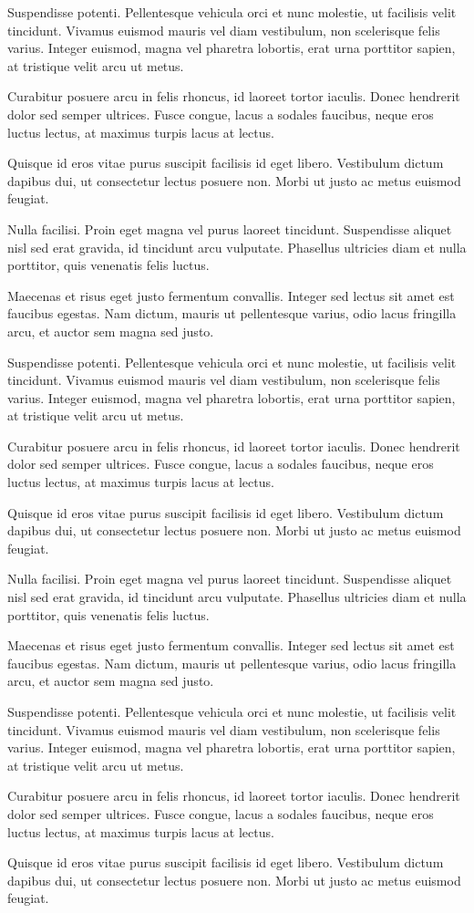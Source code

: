 Suspendisse potenti. Pellentesque vehicula orci et nunc molestie, ut facilisis velit tincidunt. Vivamus euismod mauris vel diam vestibulum, non scelerisque felis varius. Integer euismod, magna vel pharetra lobortis, erat urna porttitor sapien, at tristique velit arcu ut metus.

Curabitur posuere arcu in felis rhoncus, id laoreet tortor iaculis. Donec hendrerit dolor sed semper ultrices. Fusce congue, lacus a sodales faucibus, neque eros luctus lectus, at maximus turpis lacus at lectus.

Quisque id eros vitae purus suscipit facilisis id eget libero. Vestibulum dictum dapibus dui, ut consectetur lectus posuere non. Morbi ut justo ac metus euismod feugiat.

Nulla facilisi. Proin eget magna vel purus laoreet tincidunt. Suspendisse aliquet nisl sed erat gravida, id tincidunt arcu vulputate. Phasellus ultricies diam et nulla porttitor, quis venenatis felis luctus.

Maecenas et risus eget justo fermentum convallis. Integer sed lectus sit amet est faucibus egestas. Nam dictum, mauris ut pellentesque varius, odio lacus fringilla arcu, et auctor sem magna sed justo.

Suspendisse potenti. Pellentesque vehicula orci et nunc molestie, ut facilisis velit tincidunt. Vivamus euismod mauris vel diam vestibulum, non scelerisque felis varius. Integer euismod, magna vel pharetra lobortis, erat urna porttitor sapien, at tristique velit arcu ut metus.

Curabitur posuere arcu in felis rhoncus, id laoreet tortor iaculis. Donec hendrerit dolor sed semper ultrices. Fusce congue, lacus a sodales faucibus, neque eros luctus lectus, at maximus turpis lacus at lectus.

Quisque id eros vitae purus suscipit facilisis id eget libero. Vestibulum dictum dapibus dui, ut consectetur lectus posuere non. Morbi ut justo ac metus euismod feugiat.

Nulla facilisi. Proin eget magna vel purus laoreet tincidunt. Suspendisse aliquet nisl sed erat gravida, id tincidunt arcu vulputate. Phasellus ultricies diam et nulla porttitor, quis venenatis felis luctus.

Maecenas et risus eget justo fermentum convallis. Integer sed lectus sit amet est faucibus egestas. Nam dictum, mauris ut pellentesque varius, odio lacus fringilla arcu, et auctor sem magna sed justo.

Suspendisse potenti. Pellentesque vehicula orci et nunc molestie, ut facilisis velit tincidunt. Vivamus euismod mauris vel diam vestibulum, non scelerisque felis varius. Integer euismod, magna vel pharetra lobortis, erat urna porttitor sapien, at tristique velit arcu ut metus.

Curabitur posuere arcu in felis rhoncus, id laoreet tortor iaculis. Donec hendrerit dolor sed semper ultrices. Fusce congue, lacus a sodales faucibus, neque eros luctus lectus, at maximus turpis lacus at lectus.

Quisque id eros vitae purus suscipit facilisis id eget libero. Vestibulum dictum dapibus dui, ut consectetur lectus posuere non. Morbi ut justo ac metus euismod feugiat.

\ifPDF
{}
\fi